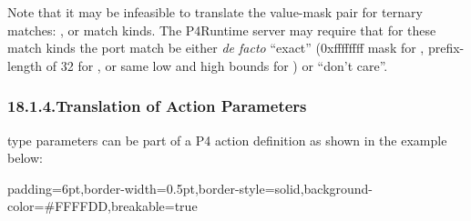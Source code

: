 \documentclass[11pt]{article}
\begin{document}
{%
Note that it may be infeasible to translate the value-mask pair for ternary
matches: ,  or  match kinds.  The P4Runtime server may
require that for these match kinds the port match be either \emph{de facto} \textquotedblleft{}exact\textquotedblright{}
(0xffffffff mask for , prefix-length of 32 for , or same low and
high bounds for ) or \textquotedblleft{}don't care\textquotedblright{}.%

\subsubsection{18.1.4.\hspace*{0.5em}Translation of Action Parameters}\label{sec-translation-of-action-parameters}%

\noindent{} type parameters can be part of a P4 action definition as shown in the
example below:%

\begin{mdbmargintb}{6pt}{6pt}%
\begin{mdblock}{padding=6pt,border-width=0.5pt,border-style=solid,background-color=\#FFFFDD,breakable=true}%
\begin{mdpre}%
\end{mdpre}%
\end{mdblock}%
\end{mdbmargintb}%

}
\end{document}

